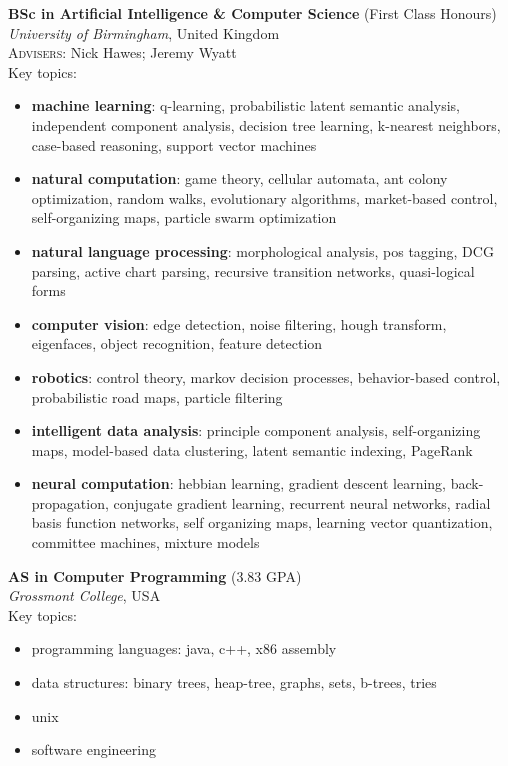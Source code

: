 \documentclass[10pt, a4paper]{article}
\newcommand{\years}[1]{\marginnote{\scriptsize #1}}
\begin{document}
\years{2012}
\textbf{BSc in Artificial Intelligence \& Computer Science} (First Class Honours)\\
\textsl{University of Birmingham}, United Kingdom\\
\small{\textsc{Advisers:} Nick Hawes; Jeremy Wyatt}\\[.2cm]
Key topics:
\begin{itemize}
\item \textbf{machine learning}: q-learning, probabilistic latent
  semantic analysis, independent component analysis, decision tree
  learning, k-nearest neighbors, case-based reasoning, support vector
  machines
\item \textbf{natural computation}: game theory, cellular automata, ant
  colony optimization, random walks, evolutionary algorithms,
  market-based control, self-organizing maps, particle swarm
  optimization
\item \textbf{natural language processing}: morphological analysis,
  pos tagging, DCG parsing, active chart parsing, recursive transition
  networks, quasi-logical forms
\item \textbf{computer vision}: edge detection, noise filtering, hough
  transform, eigenfaces, object recognition, feature detection
\item \textbf{robotics}: control theory, markov decision processes,
  behavior-based control, probabilistic road maps, particle filtering
\item \textbf{intelligent data analysis}: principle component
  analysis, self-organizing maps, model-based data clustering, latent
  semantic indexing, PageRank
\item \textbf{neural computation}: hebbian learning, gradient descent
  learning, back-propagation, conjugate gradient learning, recurrent
  neural networks, radial basis function networks, self organizing
  maps, learning vector quantization, committee machines, mixture
  models
\end{itemize}
\vspace{.25cm}

\years{2009}
\textbf{AS in Computer Programming} (3.83 GPA)\\
\textit{Grossmont College}, USA\\[.2cm]
Key topics:
\begin{itemize}
\item programming languages: java, c++, x86 assembly
\item data structures: binary trees, heap-tree, graphs, sets,
  b-trees, tries
\item unix
\item software engineering
\end{itemize}
\end{document}
